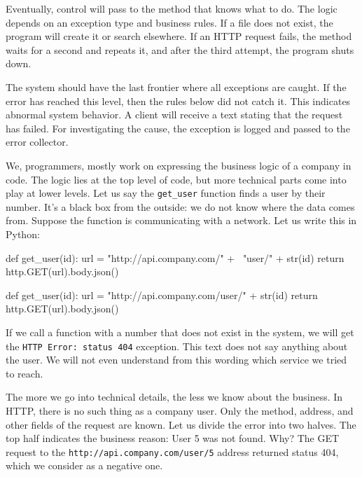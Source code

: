 Eventually, control will pass to the method that knows what to do. The logic depends on an exception type and business rules. If a file does not exist, the program will create it or search elsewhere. If an HTTP request fails, the method waits for a second and repeats it, and after the third attempt, the program shuts down.

The system should have the last frontier where all exceptions are caught. If the error has reached this level, then the rules below did not catch it. This indicates abnormal system behavior. A client will receive a text stating that the request has failed. For investigating the cause, the exception is logged and passed to the error collector.

We, programmers, mostly work on expressing the business logic of a company in code. The logic lies at the top level of code, but more technical parts come into play at lower levels. Let us say the \verb|get_user| function finds a user by their number. It's a black box from the outside: we do not know where the data comes from. Suppose the function is communicating with a network. Let us write this in Python:


\ifnarrow

\begin{english}
  \begin{python}
def get_user(id):
  url = "http://api.company.com/" + \
        "user/" + str(id)
  return http.GET(url).body.json()
  \end{python}
\end{english}

\else

\begin{english}
  \begin{python}
def get_user(id):
  url = "http://api.company.com/user/" + str(id)
  return http.GET(url).body.json()
  \end{python}
\end{english}

\fi

If we call a function with a number that does not exist in the system, we will get the \verb|HTTP Error: status 404| exception. This text does not say anything about the user. We will not even understand from this wording which service we tried to reach.

The more we go into technical details, the less we know about the business. In HTTP, there is no such thing as a company user. Only the method, address, and other fields of the request are known. Let us divide the error into two halves. The top half indicates the business reason: User 5 was not found. Why? The GET request to the \verb|http://api.company.com/user/5| address returned status 404, which we consider as a negative one.

